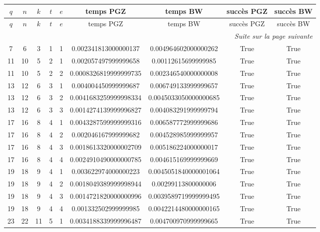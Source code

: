 \documentclass[a4paper,11pt]{article}
\begin{document}
\begin{landscape}
\small
\setlength{\LTleft}{0pt}
\setlength{\LTright}{0pt}
\begin{longtable}{ccccccccc}
\toprule
$q$ & $n$ & $k$ & $t$ & $e$ & temps PGZ & temps BW & succès PGZ & succès BW \\
\midrule
\endfirsthead

\toprule
$q$ & $n$ & $k$ & $t$ & $e$ & temps PGZ & temps BW & succès PGZ & succès BW \\
\midrule
\endhead

\midrule
\multicolumn{9}{r}{\emph{Suite sur la page suivante}} \\
\endfoot

\bottomrule
\endlastfoot

7 & 6 & 3 & 1 & 1 & 0.002341813000000137 & 0.004964602000000262 & True & True \\
11 & 10 & 5 & 2 & 1 & 0.002057497999999658 & 0.00112615699999985 & True & True \\
11 & 10 & 5 & 2 & 2 & 0.0008326819999999735 & 0.002346540000000008 & True & True \\
13 & 12 & 6 & 3 & 1 & 0.004004450999999687 & 0.006749133999999657 & True & True \\
13 & 12 & 6 & 3 & 2 & 0.0041683259999998334 & 0.0045033050000000685 & True & True \\
13 & 12 & 6 & 3 & 3 & 0.0014274139999996827 & 0.004083291999999794 & True & True \\
17 & 16 & 8 & 4 & 1 & 0.0043287599999999316 & 0.006587772999999686 & True & True \\
17 & 16 & 8 & 4 & 2 & 0.002046167999999682 & 0.004528985999999957 & True & True \\
17 & 16 & 8 & 4 & 3 & 0.0018613320000002709 & 0.005186224000000017 & True & True \\
17 & 16 & 8 & 4 & 4 & 0.0024910490000000785 & 0.004615169999999669 & True & True \\
19 & 18 & 9 & 4 & 1 & 0.003622974000000223 & 0.0045051840000001064 & True & True \\
19 & 18 & 9 & 4 & 2 & 0.0018049389999998944 & 0.00299113800000006 & True & True \\
19 & 18 & 9 & 4 & 3 & 0.0014721820000000996 & 0.0039589719999999495 & True & True \\
19 & 18 & 9 & 4 & 4 & 0.001332502999999985 & 0.0042214480000000165 & True & True \\
23 & 22 & 11 & 5 & 1 & 0.0034188339999996487 & 0.004700970999999665 & True & True \\

\end{longtable}
\end{landscape}
\end{document}
